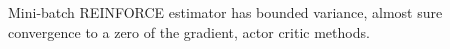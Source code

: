 Mini-batch REINFORCE estimator has bounded variance, almost sure convergence to a zero of the gradient, actor critic methods.